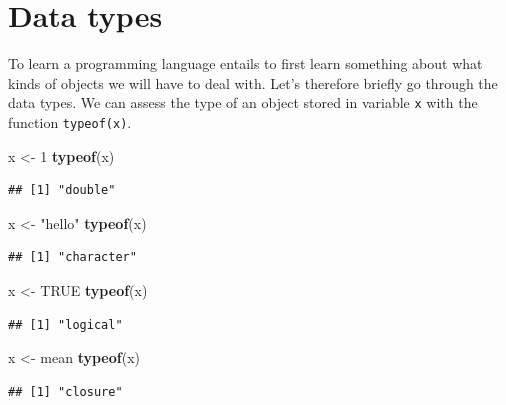 \documentclass[
]{book}
\newenvironment{Shaded}{\begin{snugshade}}{\end{snugshade}}
\newcommand{\ConstantTok}[1]{\textcolor[rgb]{0.56,0.35,0.01}{#1}}
\newcommand{\DecValTok}[1]{\textcolor[rgb]{0.00,0.00,0.81}{#1}}
\newcommand{\FunctionTok}[1]{\textcolor[rgb]{0.13,0.29,0.53}{\textbf{#1}}}
\newcommand{\NormalTok}[1]{#1}
\newcommand{\OtherTok}[1]{\textcolor[rgb]{0.56,0.35,0.01}{#1}}
\newcommand{\StringTok}[1]{\textcolor[rgb]{0.31,0.60,0.02}{#1}}
\begin{document}
\hypertarget{data-types}{%
\section{Data types}\label{data-types}}

To learn a programming language entails to first learn something about what kinds of objects we will have to deal with. Let's therefore briefly go through the data types. We can assess the type of an object stored in variable \texttt{x} with the function \texttt{typeof(x)}.

\begin{Shaded}
\begin{Highlighting}[]
\NormalTok{x }\OtherTok{\textless{}{-}} \DecValTok{1}
\FunctionTok{typeof}\NormalTok{(x)}
\end{Highlighting}
\end{Shaded}

\begin{verbatim}
## [1] "double"
\end{verbatim}

\begin{Shaded}
\begin{Highlighting}[]
\NormalTok{x }\OtherTok{\textless{}{-}} \StringTok{"hello"}
\FunctionTok{typeof}\NormalTok{(x)}
\end{Highlighting}
\end{Shaded}

\begin{verbatim}
## [1] "character"
\end{verbatim}

\begin{Shaded}
\begin{Highlighting}[]
\NormalTok{x }\OtherTok{\textless{}{-}} \ConstantTok{TRUE}
\FunctionTok{typeof}\NormalTok{(x)}
\end{Highlighting}
\end{Shaded}

\begin{verbatim}
## [1] "logical"
\end{verbatim}

\begin{Shaded}
\begin{Highlighting}[]
\NormalTok{x }\OtherTok{\textless{}{-}}\NormalTok{ mean}
\FunctionTok{typeof}\NormalTok{(x)}
\end{Highlighting}
\end{Shaded}

\begin{verbatim}
## [1] "closure"
\end{verbatim}
\end{document}
